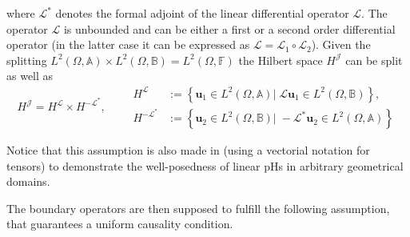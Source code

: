 \begin{assumption}
	where $\mathcal{L}^*$ denotes the formal adjoint of the linear differential operator $\mathcal{L}$. 	The operator $\mathcal{L}$ is unbounded and  can be either a first or a second order differential operator (in the latter case it can be expressed as $\mathcal{L} = \mathcal{L}_1 \circ \mathcal{L}_2$). Given the splitting $L^2(\Omega, \mathbb{A}) \times L^2(\Omega, \mathbb{B}) = L^2(\Omega, \mathbb{F})$ the Hilbert space $H^\mathcal{J}$ can be split as well as 
	\begin{equation}
		H^\mathcal{J} = H^\mathcal{L} \times H^\mathcal{-L^*}, \qquad
		\begin{aligned}
		H^\mathcal{L} &:= \left\{\bm{u}_1 \in L^2(\Omega, \mathbb{A}) \vert \; \mathcal{L}\bm{u}_1 \in L^2(\Omega, \mathbb{B}) \right\}, \\
		H^\mathcal{-L^*} &:= \left\{\bm{u}_2 \in L^2(\Omega, \mathbb{B}) \vert \; -\mathcal{L}^*\bm{u}_2 \in L^2(\Omega, \mathbb{A}) \right\}
		\end{aligned}
	\end{equation}
\end{assumption}

\begin{remark}
	Notice that this assumption is also made in \cite{skrepek2019wellposedness} (using a vectorial notation for tensors) to demonstrate the well-posedness of linear pHs in arbitrary geometrical domains.
\end{remark}

The boundary operators are then supposed to fulfill the following assumption, that guarantees a uniform causality condition.

